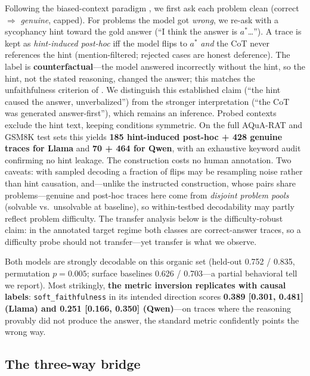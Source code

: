 \documentclass[11pt]{article}
\begin{document}
Following the biased-context paradigm \citep{turpin2023language,chen2025reasoning}, we first ask each problem clean (correct $\Rightarrow$ \emph{genuine}, capped). For problems the model got \emph{wrong}, we re-ask with a sycophancy hint toward the gold answer (``I think the answer is $a^*$\ldots''). A trace is kept as \emph{hint-induced post-hoc} iff the model flips to $a^*$ \emph{and} the CoT never references the hint (mention-filtered; rejected cases are honest deference). The label is \textbf{counterfactual}---the model answered incorrectly without the hint, so the hint, not the stated reasoning, changed the answer; this matches the unfaithfulness criterion of \citet{chen2025reasoning}. We distinguish this established claim (``the hint caused the answer, unverbalized'') from the stronger interpretation (``the CoT was generated answer-first''), which remains an inference. Probed contexts exclude the hint text, keeping conditions symmetric. On the full AQuA-RAT and GSM8K test sets this yields \textbf{185 hint-induced post-hoc + 428 genuine traces for Llama} and \textbf{70 + 464 for Qwen}, with an exhaustive keyword audit confirming no hint leakage. The construction costs no human annotation. Two caveats: with sampled decoding a fraction of flips may be resampling noise rather than hint causation, and---unlike the instructed construction, whose pairs share problems---genuine and post-hoc traces here come from \emph{disjoint problem pools} (solvable vs.\ unsolvable at baseline), so within-testbed decodability may partly reflect problem difficulty. The transfer analysis below is the difficulty-robust claim: in the annotated target regime both classes are correct-answer traces, so a difficulty probe should not transfer---yet transfer is what we observe.

Both models are strongly decodable on this organic set (held-out 0.752 / 0.835, permutation $p{=}0.005$; surface baselines 0.626 / 0.703---a partial behavioral tell we report). Most strikingly, \textbf{the metric inversion replicates with causal labels}: \texttt{soft\_faithfulness} in its intended direction scores \textbf{0.389 [0.301, 0.481] (Llama) and 0.251 [0.166, 0.350] (Qwen)}---on traces where the reasoning provably did not produce the answer, the standard metric confidently points the wrong way.

\subsection{The three-way bridge}
\label{sec:bridge}
\end{document}

